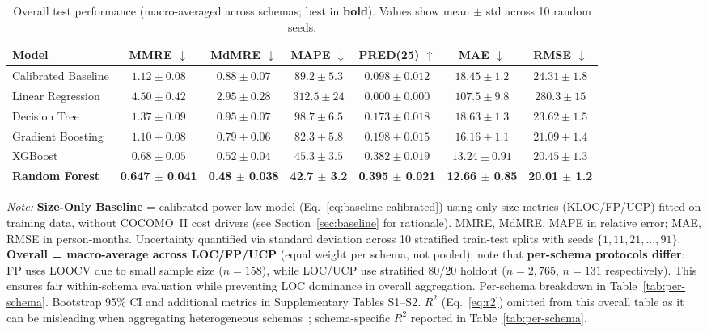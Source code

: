 \documentclass{ieeeaccess}
\begin{document}
\begin{table}[t]
\centering
\caption{Overall test performance (macro-averaged across schemas; best in \textbf{bold}). Values show mean $\pm$ std across 10 random seeds.}
\label{tab:overall}
\small
\begin{tabular}{l c c c c c c}
\toprule
Model & MMRE $\downarrow$ & MdMRE $\downarrow$ & MAPE $\downarrow$ & PRED(25) $\uparrow$ & MAE $\downarrow$ & RMSE $\downarrow$ \\
\midrule
Calibrated Baseline & $1.12 \pm 0.08$ & $0.88 \pm 0.07$ & $89.2 \pm 5.3$ & $0.098 \pm 0.012$ & $18.45 \pm 1.2$ & $24.31 \pm 1.8$ \\
Linear Regression & $4.50 \pm 0.42$ & $2.95 \pm 0.28$ & $312.5 \pm 24$ & $0.000 \pm 0.000$ & $107.5 \pm 9.8$ & $280.3 \pm 15$ \\
Decision Tree & $1.37 \pm 0.09$ & $0.95 \pm 0.07$ & $98.7 \pm 6.5$ & $0.173 \pm 0.018$ & $18.63 \pm 1.3$ & $23.62 \pm 1.5$ \\
Gradient Boosting & $1.10 \pm 0.08$ & $0.79 \pm 0.06$ & $82.3 \pm 5.8$ & $0.198 \pm 0.015$ & $16.16 \pm 1.1$ & $21.09 \pm 1.4$ \\
XGBoost & $0.68 \pm 0.05$ & $0.52 \pm 0.04$ & $45.3 \pm 3.5$ & $0.382 \pm 0.019$ & $13.24 \pm 0.91$ & $20.45 \pm 1.3$ \\
\textbf{Random Forest} & \textbf{0.647 $\pm$ 0.041} & \textbf{0.48 $\pm$ 0.038} & \textbf{42.7 $\pm$ 3.2} & \textbf{0.395 $\pm$ 0.021} & \textbf{12.66 $\pm$ 0.85} & \textbf{20.01 $\pm$ 1.2} \\
\bottomrule
\end{tabular}
\vspace{0.3em}
\raggedright\footnotesize
\textit{Note:} \textbf{Size-Only Baseline} = calibrated power-law model (Eq.~\ref{eq:baseline-calibrated}) using only size metrics (KLOC/FP/UCP) fitted on training data, without COCOMO~II cost drivers (see Section~\ref{sec:baseline} for rationale). MMRE, MdMRE, MAPE in relative error; MAE, RMSE in person-months. Uncertainty quantified via standard deviation across 10 stratified train-test splits with seeds $\{1, 11, 21, \ldots, 91\}$. \textbf{Overall = macro-average across LOC/FP/UCP} (equal weight per schema, not pooled); note that \textbf{per-schema protocols differ}: FP uses LOOCV due to small sample size ($n=158$), while LOC/UCP use stratified 80/20 holdout ($n=2{,}765$, $n=131$ respectively). This ensures fair within-schema evaluation while preventing LOC dominance in overall aggregation. Per-schema breakdown in Table~\ref{tab:per-schema}. Bootstrap 95\% CI and additional metrics in Supplementary Tables S1--S2. $R^2$ (Eq.~\ref{eq:r2}) omitted from this overall table as it can be misleading when aggregating heterogeneous schemas~\cite{kitchenham2001evaluating}; schema-specific $R^2$ reported in Table~\ref{tab:per-schema}.
\end{table}
\end{document}
